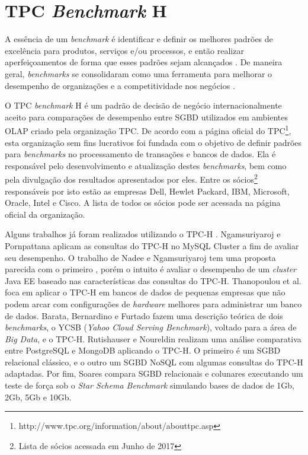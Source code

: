 \chapter{TPC \textit{Benchmark} H}
\label{tpch}

A essência de um \textit{benchmark} é identificar e definir os melhores padrões de excelência para produtos, serviços e/ou processos, e então realizar aperfeiçoamentos de forma que esses padrões sejam alcançados \cite{bhutta1999benchmarking}. De maneira geral, \textit{benchmarks} se consolidaram como uma ferramenta para melhorar o desempenho de organizações e a competitividade nos negócios \cite{kyro2003revising}.

O TPC \textit{\textit{benchmark}} H é um padrão de decisão de negócio internacionalmente aceito para comparações de desempenho entre SGBD utilizados em ambientes OLAP criado pela organização TPC. De acordo com a página oficial do TPC\footnote{http://www.tpc.org/information/about/abouttpc.asp}, esta organização sem fins lucrativos foi fundada com o objetivo de definir padrões para \textit{benchmarks} no processamento de transações e bancos de dados. Ela é responsável pelo desenvolvimento e atualização destes \textit{benchmarks}, bem como pela divulgação dos resultados apresentados por eles. Entre os sócios\footnote{Lista de sócios acessada em Junho de 2017} responsáveis por isto estão as empresas Dell, Hewlet Packard, IBM, Microsoft, Oracle, Intel e Cisco. A lista de todos os sócios pode ser acessada na página oficial da organização.

Alguns trabalhos já foram realizados utilizando o TPC-H \cite{ngamsuriyaroj2010performance, nadee2012performance, thanopoulou2012benchmarking, barata2014ycsb, rutishauser2012tpc, soares2012avaliaccao}. Ngamsuriyaroj e Pornpattana \cite{ngamsuriyaroj2010performance} aplicam as consultas do TPC-H no MySQL Cluster a fim de avaliar seu desempenho. O trabalho de Nadee e Ngamsuriyaroj \cite{nadee2012performance} tem uma proposta parecida com o primeiro \cite{ngamsuriyaroj2010performance}, porém o intuito é avaliar o desempenho de um \textit{cluster} Java EE baseado nas características das consultas do TPC-H. Thanopoulou et al. \cite{thanopoulou2012benchmarking} foca em aplicar o TPC-H em bancos de dados de pequenas empresas que não podem arcar com configurações de \textit{hardware} melhores para administrar um banco de dados. Barata, Bernardino e Furtado \cite{barata2014ycsb} fazem uma descrição teórica de dois \textit{benchmarks}, o YCSB (\textit{Yahoo Cloud Serving Benchmark}), voltado para a área de \textit{Big Data}, e o TPC-H. Rutishauser e Noureldin \cite{rutishauser2012tpc} realizam uma análise comparativa entre PostgreSQL e MongoDB aplicando o TPC-H. O primeiro é um SGBD relacional clássico, e o outro um SGBD NoSQL com algumas consultas do TPC-H adaptadas. Por fim, Soares \cite{soares2012avaliaccao} compara SGBD relacionais e colunares executando um teste de força sob o \textit{Star Schema Benchmark} simulando bases de dados de 1Gb, 2Gb, 5Gb e 10Gb.

